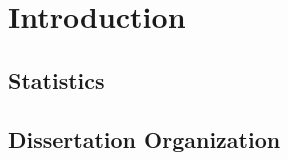 \chapter{Introduction} \label{chap-intro}





    

\section{Statistics}

\section{Dissertation Organization}
